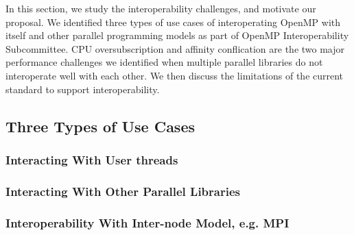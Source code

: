 In this section, we study the interoperability challenges, and motivate our proposal. 
We identified three types of use cases of interoperating OpenMP with itself and other parallel programming models as part of OpenMP Interoperability
Subcommittee. CPU oversubscription and affinity conflication are the two major performance challenges we identified
when multiple parallel libraries do not interoperate well with each other. We then discuss the limitations of the current standard to support 
interoperability. 
\subsection{Three Types of Use Cases} %
\subsubsection{Interacting With User threads}


%

\subsubsection{Interacting With Other Parallel Libraries}


\subsubsection{Interoperability With Inter-node Model, e.g. MPI}




